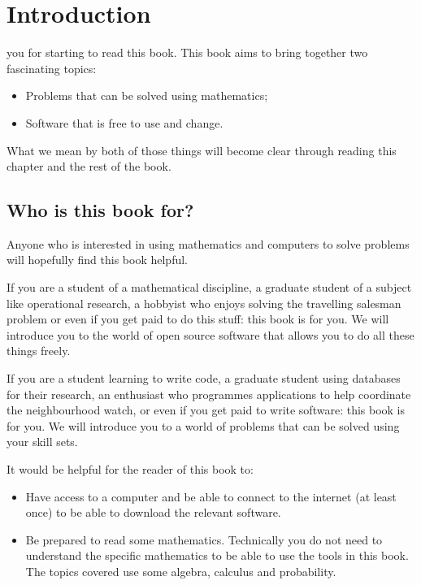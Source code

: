 \chapter[Introduction]{Introduction}

 you for starting to read this book. This book aims to
bring together two fascinating topics:

\begin{itemize}
\item
  Problems that can be solved using mathematics;
\item
  Software that is free to use and change.
\end{itemize}

What we mean by both of those things will become clear through reading
this chapter and the rest of the book.

\section{Who is this book for?}\label{sec:who-is-this-book-for}

Anyone who is interested in using mathematics and computers to solve
problems will hopefully find this book helpful.


If you are a student of a mathematical discipline, a graduate student of
a subject like operational research, a hobbyist who enjoys solving the
travelling salesman problem or even if you get paid to do this stuff:
this book is for you. We will introduce you to the world of open source
software that allows you to do all these things freely.

If you are a student learning to write code, a graduate student using
databases for their research, an enthusiast who programmes applications
to help coordinate the neighbourhood watch, or even if you get paid to
write software: this book is for you. We will introduce you to a world
of problems that can be solved using your skill sets.

It would be helpful for the reader of this book to:

\begin{itemize}
\item
  Have access to a computer and be able to connect to the internet (at
  least once) to be able to download the relevant software.
\item
  Be prepared to read some mathematics. Technically you do not need to
  understand the specific mathematics to be able to use the tools in this book.
  The topics covered use some algebra, calculus and probability.
\end{itemize}

